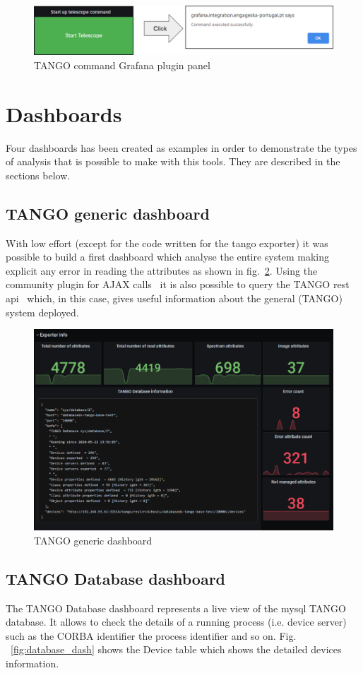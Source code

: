 \documentclass[]{spie}  %
\begin{document}
\begin{figure}[!htb]
   \centering
   \includegraphics*[width=0.6\columnwidth]{tango command}
       \caption{TANGO command Grafana plugin panel}
   \label{fig:tangocommand}
\end{figure}

\section{Dashboards}
Four dashboards has been created as examples in order to demonstrate the types of analysis that is possible to make with this tools. They are described in the sections below. 

\subsection{TANGO generic dashboard}
With low effort (except for the code written for the tango exporter) it was possible to build a first dashboard which analyse the entire system making explicit any error in reading the attributes as shown in fig.~\ref{fig:tangodashboard1}. Using the community plugin for AJAX calls~\cite{ryantxu-ajax-panel} it is also possible to query the TANGO rest api~\cite{tango-rest} which, in this case, gives useful information about the general (TANGO) system deployed. 

\begin{figure}[!htb]
   \centering
   \includegraphics*[width=0.6\columnwidth]{tangodashboard1}
       \caption{TANGO generic dashboard}
   \label{fig:tangodashboard1}
\end{figure}

\subsection{TANGO Database dashboard}
The TANGO Database dashboard represents a live view of the mysql TANGO database. It allows to check the details of a running process (i.e. device server) such as the CORBA identifier the process identifier and so on. Fig. ~\ref{fig:database_dash} shows the Device table which shows the detailed devices information. 
\end{document}
